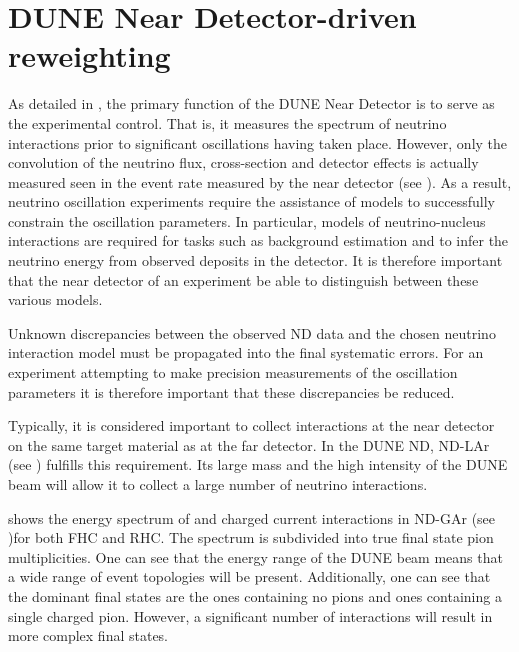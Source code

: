 \chapter{DUNE Near Detector-driven reweighting}
\label{sec:dune_ndrwt}

As detailed in , the primary function of the DUNE Near Detector is to serve as the experimental control.
That is, it measures the spectrum of neutrino interactions prior to significant oscillations having taken place.
However, only the convolution of the neutrino flux, cross-section and detector effects is actually measured seen in the event rate measured by the near detector (see ).
As a result, neutrino oscillation experiments require the assistance of models to successfully constrain the oscillation parameters.
In particular, models of neutrino-nucleus interactions are required for tasks such as background estimation and to infer the neutrino energy from observed deposits in the detector.
It is therefore important that the near detector of an experiment be able to distinguish between these various models.

Unknown discrepancies between the observed ND data and the chosen neutrino interaction model must be propagated into the final systematic errors.
For an experiment attempting to make precision measurements of the oscillation parameters it is therefore important that these discrepancies be reduced.

Typically, it is considered important to collect interactions at the near detector on the same target material as at the far detector.
In the DUNE ND, ND-LAr (see ) fulfills this requirement.
Its large mass and the high intensity of the DUNE beam will allow it to collect a large number of neutrino interactions.


 shows the energy spectrum of \numu and \anumu charged current interactions in ND-GAr (see )for both FHC and RHC.
The spectrum is subdivided into true final state pion multiplicities. 
One can see that the energy range of the DUNE beam means that a wide range of event topologies will be present.
Additionally, one can see that the dominant final states are the ones containing no pions and ones containing a single charged pion.
However, a significant number of interactions will result in more complex final states.

